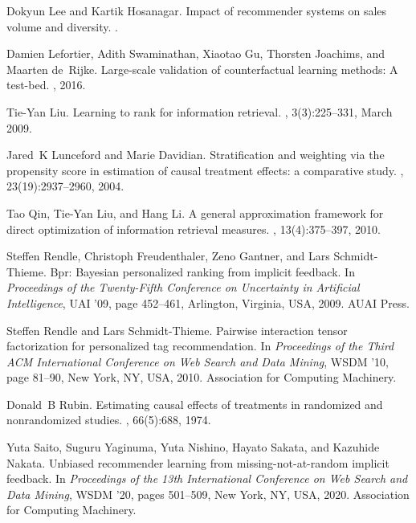 \documentclass[manuscript,screen]{acmart}
\begin{document}
\begin{thebibliography}{10}
	Dokyun Lee and Kartik Hosanagar.
	\newblock Impact of recommender systems on sales volume and diversity.
	.
	
	Damien Lefortier, Adith Swaminathan, Xiaotao Gu, Thorsten Joachims, and Maarten
	de~Rijke.
	\newblock Large-scale validation of counterfactual learning methods: A
	test-bed.
	, 2016.
	
	Tie-Yan Liu.
	\newblock Learning to rank for information retrieval.
	, 3(3):225--331, March 2009.
	
	Jared~K Lunceford and Marie Davidian.
	\newblock Stratification and weighting via the propensity score in estimation
	of causal treatment effects: a comparative study.
	, 23(19):2937--2960, 2004.
	
	Tao Qin, Tie-Yan Liu, and Hang Li.
	\newblock A general approximation framework for direct optimization of
	information retrieval measures.
	, 13(4):375--397, 2010.
	
	Steffen Rendle, Christoph Freudenthaler, Zeno Gantner, and Lars Schmidt-Thieme.
	\newblock Bpr: Bayesian personalized ranking from implicit feedback.
	\newblock In {\em Proceedings of the Twenty-Fifth Conference on Uncertainty in
		Artificial Intelligence}, UAI '09, page 452--461, Arlington, Virginia,
	USA, 2009. AUAI Press.
	
	Steffen Rendle and Lars Schmidt-Thieme.
	\newblock Pairwise interaction tensor factorization for personalized tag
	recommendation.
	\newblock In {\em Proceedings of the Third ACM International Conference on Web
		Search and Data Mining}, WSDM '10, page 81--90, New York, NY, USA, 2010.
	Association for Computing Machinery.
	
	Donald~B Rubin.
	\newblock Estimating causal effects of treatments in randomized and
	nonrandomized studies.
	, 66(5):688, 1974.
	
	Yuta Saito, Suguru Yaginuma, Yuta Nishino, Hayato Sakata, and Kazuhide Nakata.
	\newblock Unbiased recommender learning from missing-not-at-random implicit
	feedback.
	\newblock In {\em Proceedings of the 13th International Conference on Web
		Search and Data Mining}, WSDM '20, pages 501--509, New York, NY, USA,
	2020. Association for Computing Machinery.
	

\end{thebibliography}
\end{document}
